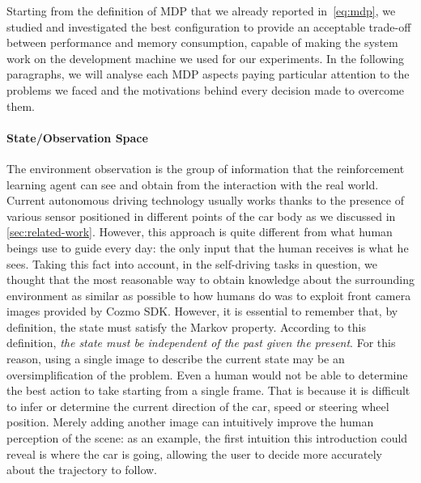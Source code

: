 Starting from the definition of MDP that we already reported in~\vref{eq:mdp}, we studied and investigated the best configuration to provide an acceptable trade-off between performance and memory consumption, capable of making the system work on the development machine we used for our experiments.
In the following paragraphs, we will analyse each MDP aspects paying particular attention to the problems we faced and the motivations behind every decision made to overcome them.

\paragraph{State/Observation Space}
The environment observation is the group of information that the reinforcement learning agent can see and obtain from the interaction with the real world.
Current autonomous driving technology usually works thanks to the presence of various sensor positioned in different points of the car body as we discussed in \vref{sec:related-work}.
However, this approach is quite different from what human beings use to guide every day: the only input that the human receives is what he sees.
Taking this fact into account, in the self-driving tasks in question, we thought that the most reasonable way to obtain knowledge about the surrounding environment as similar as possible to how humans do was to exploit front camera images provided by Cozmo SDK.
However, it is essential to remember that, by definition, the state must satisfy the Markov property.
According to this definition, \textit{the state must be independent of the past given the present}.
For this reason, using a single image to describe the current state may be an oversimplification of the problem.
Even a human would not be able to determine the best action to take starting from a single frame.
That is because it is difficult to infer or determine the current direction of the car, speed or steering wheel position.
Merely adding another image can intuitively improve the human perception of the scene: as an example, the first intuition this introduction could reveal is where the car is going, allowing the user to decide more accurately about the trajectory to follow.

